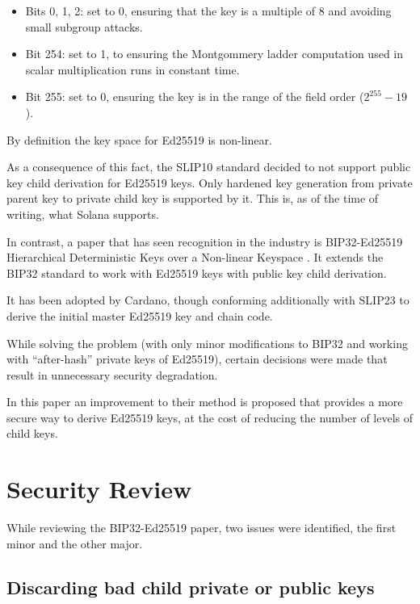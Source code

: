\documentclass[12pt, a4paper, twocolumn]{article}
\begin{document}
\begin{itemize}[label=\textendash, itemsep=-0.5em]
  \item Bits 0, 1, 2:  set to 0, ensuring that the key is a multiple of 8 and avoiding small subgroup attacks.
  \item Bit 254: set to 1, to ensuring the Montgommery ladder computation used in scalar multiplication runs in constant time.
  \item Bit 255: set to 0, ensuring the key is in the range of the field order ($2^{255} - 19$).
\end{itemize}

By definition the key space for Ed25519 is non-linear.

As a consequence of this fact, the SLIP10\cite{SLIP10} standard decided to not support public key child derivation for Ed25519 keys. Only hardened key generation from private parent key to private child key is supported by it. This is, as of the time of writing, what Solana supports\cite{SolanaBip32}. 

In contrast, a paper that has seen recognition in the industry is BIP32-Ed25519
Hierarchical Deterministic Keys over a Non-linear Keyspace \cite{BIP32-Ed25519}. It extends the BIP32 standard to work with Ed25519 keys with public key child derivation.

It has been adopted by Cardano, though conforming additionally with SLIP23\cite{SLIP23} to derive the initial master Ed25519 key and chain code.

While solving the problem (with only minor modifications to BIP32 and working with ``after-hash'' private keys of Ed25519)\cite{BIP32-Ed25519}, certain decisions were made that result in unnecessary security degradation.

In this paper an improvement to their method is proposed that provides a more secure way to derive Ed25519 keys, at the cost of reducing the number of levels of child keys.


\section{Security Review}

While reviewing the BIP32-Ed25519 paper\cite{BIP32-Ed25519}, two issues were identified, the first minor and the other major.

\subsection{Discarding bad child private or public keys}
\end{document}
